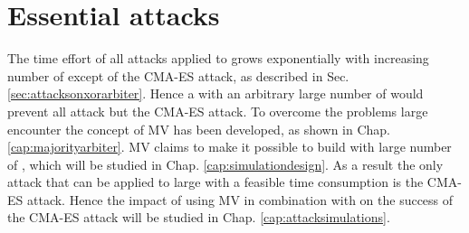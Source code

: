 
\section{Essential attacks}

The time effort of all attacks applied to \xpufs grows exponentially with increasing number of \apuf except of the \ac{CMA-ES} attack, as described in Sec. \ref{sec:attacksonxorarbiter}.
Hence a \xpuf with an arbitrary large number of \apufs would prevent all attack but the \ac{CMA-ES} attack.
To overcome the problems large \xpufs encounter the concept of \ac{MV} has been developed, as shown in Chap. \ref{cap:majorityarbiter}.
\ac{MV} claims to make it possible to build \xpufs with large number of \apufs, which will be studied in Chap. \ref{cap:simulationdesign}.
As a result the only attack that can be applied to large \xpufs with a feasible time consumption is the \ac{CMA-ES} attack.
Hence the impact of using \ac{MV} in combination with \apufs on the success of the \ac{CMA-ES} attack will be studied in Chap. \ref{cap:attacksimulations}.

